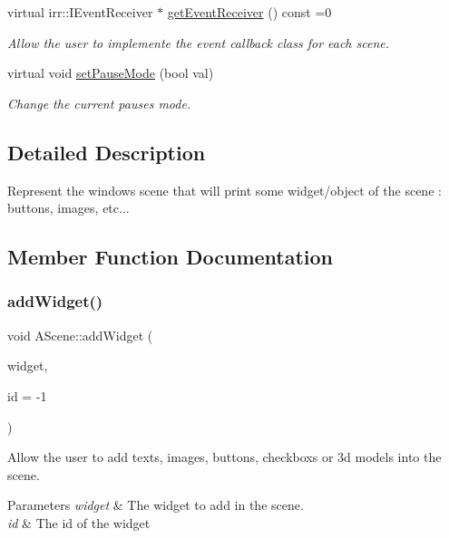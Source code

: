 \begin{DoxyCompactItemize}
virtual irr\+::\+I\+Event\+Receiver $\ast$ \hyperlink{classAScene_af521e5e6d30a5d2e5d30eb333e4d3abd}{get\+Event\+Receiver} () const =0
\begin{DoxyCompactList}\small\item\em Allow the user to implemente the event callback class for each scene. \end{DoxyCompactList}\item 
virtual void \hyperlink{classAScene_a7ff45d7a24796f52d815c00770900339}{set\+Pause\+Mode} (bool val)
\begin{DoxyCompactList}\small\item\em Change the current pause\textquotesingle{}s mode. \end{DoxyCompactList}\end{DoxyCompactItemize}


\subsection{Detailed Description}
Represent the window\textquotesingle{}s scene that will print some widget/object of the scene \+: buttons, images, etc... 

\subsection{Member Function Documentation}
\mbox{\label{classAScene_aa711b6068dd8dee262160eedfd96ad02}} 
\subsubsection{\texorpdfstring{add\+Widget()}{addWidget()}}
{\footnotesize\ttfamily void A\+Scene\+::add\+Widget (\begin{DoxyParamCaption}\item[{const std\+::shared\+\_\+ptr$<$ \hyperlink{classIWidget}{I\+Widget} $>$ \&}]{widget,  }\item[{Int}]{id = {\ttfamily -\/1} }\end{DoxyParamCaption})}



Allow the user to add texts, images, buttons, checkboxs or 3d models into the scene. 


\begin{DoxyParams}{Parameters}
{\em widget} & The widget to add in the scene. \\
\hline
{\em id} & The id of the widget \\
\hline
\end{DoxyParams}
\mbox{\label{classAScene_ad2b0ac8cd74a8523c76b681a34b5f5b4}} 
